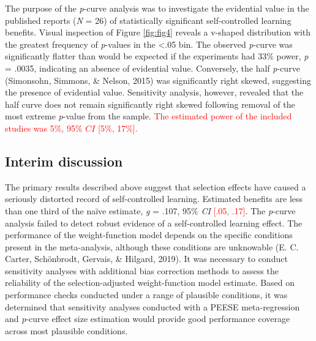 \documentclass[
  english,
  man,floatsintext]{apa7}
\begin{document}
The purpose of the \emph{p}-curve analysis was to investigate the evidential value in the published reports (\emph{N} = 26) of statistically significant self-controlled learning benefits. Visual inspection of Figure \ref{fig:fig4} reveals a v-shaped distribution with the greatest frequency of \emph{p}-values in the \textless.05 bin. The observed \emph{p}-curve was significantly flatter than would be expected if the experiments had 33\% power, \emph{p} = .0035, indicating an absence of evidential value. Conversely, the half \emph{p}-curve (Simonsohn, Simmons, \& Nelson, 2015) was significantly right skewed, suggesting the presence of evidential value. Sensitivity analysis, however, revealed that the half curve does not remain significantly right skewed following removal of the most extreme \emph{p}-value from the sample. \textcolor{red}{The estimated power of the included studies was 5\%, 95\% $CI$ [5\%, 17\%].}

\hypertarget{interim-discussion}{%
\subsection{Interim discussion}\label{interim-discussion}}

The primary results described above suggest that selection effects have caused a seriously distorted record of self-controlled learning. Estimated benefits are less than one third of the naïve estimate, \emph{g} = .107, 95\% \emph{CI} \textcolor{red}{[.05, .17]}. The \emph{p}-curve analysis failed to detect robust evidence of a self-controlled learning effect. The performance of the weight-function model depends on the specific conditions present in the meta-analysis, although these conditions are unknowable (E. C. Carter, Schönbrodt, Gervais, \& Hilgard, 2019). It was necessary to conduct sensitivity analyses with additional bias correction methods to assess the reliability of the selection-adjusted weight-function model estimate. Based on performance checks conducted under a range of plausible conditions, it was determined that sensitivity analyses conducted with a PEESE meta-regression and \emph{p}-curve effect size estimation would provide good performance coverage across most plausible conditions.
\end{document}
